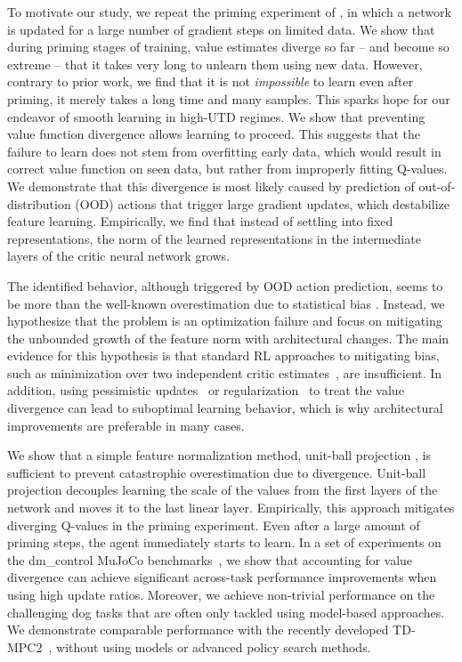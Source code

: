 To motivate our study, we repeat the priming experiment of \textcite{nikishin2022primacy}, in which a network is updated for a large number of gradient steps on limited data. We show that during priming stages of training, value estimates diverge so far -- and become so extreme -- that it takes very long to unlearn them using new 
data. However, contrary to prior work, we find that it is not \emph{impossible} to learn even after priming, it merely takes a long time and many samples. 
This sparks hope for our endeavor of smooth learning in high-UTD regimes.
We show that preventing value function divergence allows learning to proceed. 
This suggests that the failure to learn does not stem from overfitting early data, which would result in correct value function on seen data, but rather from improperly fitting Q-values. 
We demonstrate that this divergence is most likely caused by prediction of out-of-distribution (OOD) actions that trigger large gradient updates, which destabilize feature learning.
Empirically, we find that instead of settling into fixed representations, the norm of the learned representations in the intermediate layers of the critic neural network grows.

The identified behavior, although triggered by OOD action prediction, seems to be more than the well-known overestimation due to statistical bias \parencite{thrun1993issues}. 
Instead, we hypothesize that the problem is an optimization failure and focus on mitigating the unbounded growth of the feature norm with architectural changes.
The main evidence for this hypothesis is that standard RL approaches to mitigating bias, such as minimization over two independent critic estimates~\parencite{fujimoto2018addressing}, are insufficient. 
In addition, using pessimistic updates~\parencite{fujimoto2019bcq, fujimoto2021td3bc} or regularization~\parencite{krogh1991simple, srivastava14dropout} to treat the value divergence can lead to suboptimal learning behavior, which is why architectural improvements are preferable in many cases.


We show that a simple feature normalization method, unit-ball projection \parencite{bjorck2022is}, is sufficient to prevent catastrophic overestimation due to divergence.
Unit-ball projection decouples learning the scale of the values from the first layers of the network and moves it to the last linear layer.
Empirically, this approach mitigates diverging Q-values in the priming experiment. 
Even after a large amount of priming steps, the agent immediately starts to learn. %
In a set of experiments on the \textsf{dm\_control} MuJoCo benchmarks~\parencite{tunyasuvunakool2020dmcontrol}, we show that accounting for value divergence can achieve significant across-task performance improvements when using high update ratios. 
Moreover, we achieve non-trivial performance on the challenging dog tasks that are often only tackled using model-based approaches. We demonstrate comparable performance with the recently developed TD-MPC2~\parencite{hansen2024tdmpc}, without using models or advanced policy search methods.


